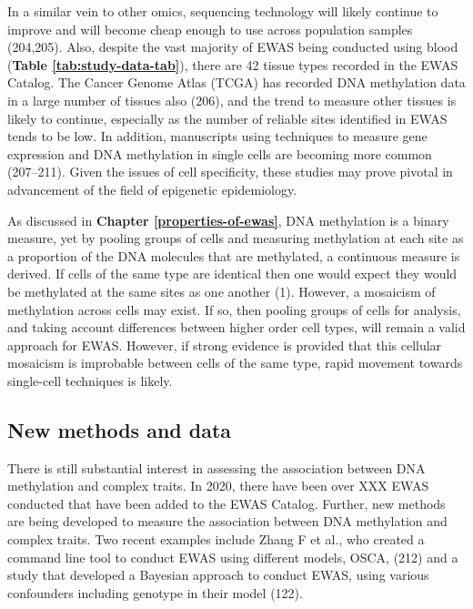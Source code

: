 \documentclass[11pt,oneside]{bristolthesis}
\begin{document}
In a similar vein to other omics, sequencing technology will likely continue to improve and will become cheap enough to use across population samples (204,205). Also, despite the vast majority of EWAS being conducted using blood (\textbf{Table \ref{tab:study-data-tab}}), there are 42 tissue types recorded in the EWAS Catalog. The Cancer Genome Atlas (TCGA) has recorded DNA methylation data in a large number of tissues also (206), and the trend to measure other tissues is likely to continue, especially as the number of reliable sites identified in EWAS tends to be low. In addition, manuscripts using techniques to measure gene expression and DNA methylation in single cells are becoming more common (207--211). Given the issues of cell specificity, these studies may prove pivotal in advancement of the field of epigenetic epidemiology.

As discussed in \textbf{Chapter \ref{properties-of-ewas}}, DNA methylation is a binary measure, yet by pooling groups of cells and measuring methylation at each site as a proportion of the DNA molecules that are methylated, a continuous measure is derived. If cells of the same type are identical then one would expect they would be methylated at the same sites as one another (1). However, a mosaicism of methylation across cells may exist. If so, then pooling groups of cells for analysis, and taking account differences between higher order cell types, will remain a valid approach for EWAS. However, if strong evidence is provided that this cellular mosaicism is improbable between cells of the same type, rapid movement towards single-cell techniques is likely.

\hypertarget{new-methods-and-data}{%
\subsection{New methods and data}\label{new-methods-and-data}}

There is still substantial interest in assessing the association between DNA methylation and complex traits. In 2020, there have been over XXX EWAS conducted that have been added to the EWAS Catalog. Further, new methods are being developed to measure the association between DNA methylation and complex traits. Two recent examples include Zhang F et al., who created a command line tool to conduct EWAS using different models, OSCA, (212) and a study that developed a Bayesian approach to conduct EWAS, using various confounders including genotype in their model (122).
\end{document}
